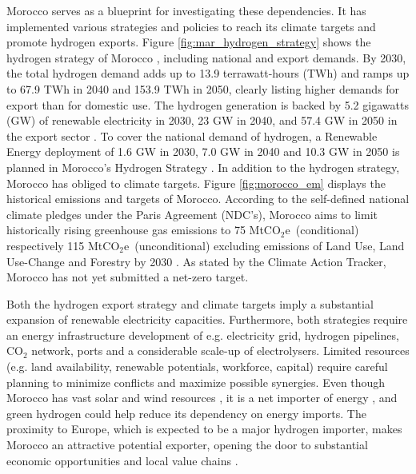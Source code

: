 \documentclass[5p,numafflabel]{elsarticle}
\def\coe{CO${}_2$e}
\begin{document}
Morocco serves as a blueprint for investigating these dependencies. It has implemented various strategies and policies to reach its climate targets and promote hydrogen exports. Figure \ref{fig:mar_hydrogen_strategy} shows the hydrogen strategy of Morocco \cite{MarHyStrat2021}, including national and export demands. By 2030, the total hydrogen demand adds up to 13.9 terrawatt-hours (TWh) and ramps up to 67.9 TWh in 2040 and 153.9 TWh in 2050, clearly listing higher demands for export than for domestic use. The hydrogen generation is backed by 5.2 gigawatts (GW) of renewable electricity in 2030, 23 GW in 2040, and 57.4 GW in 2050 in the export sector \cite{MarHyStrat2021}. To cover the national demand of hydrogen, a Renewable Energy deployment of 1.6 GW in 2030, 7.0 GW in 2040 and 10.3 GW in 2050 is planned in Morocco's Hydrogen Strategy \cite{MarHyStrat2021}. In addition to the hydrogen strategy, Morocco has obliged to climate targets. Figure \ref{fig:morocco_em} displays the historical emissions and targets of Morocco.
According to the self-defined national climate pledges under the Paris Agreement (NDC's), Morocco aims to limit historically rising greenhouse gas emissions to 75 Mt\coe\ (conditional) respectively 115 Mt\coe\ (unconditional) excluding emissions of Land Use, Land Use-Change and Forestry by 2030 \cite{CAT2021}. 
As stated by the Climate Action Tracker\cite{CAT2021}, Morocco has not yet submitted a net-zero target. 

Both the hydrogen export strategy and climate targets imply a substantial expansion of renewable electricity capacities. Furthermore, both strategies require an energy infrastructure development of e.g. electricity grid, hydrogen pipelines, $\mathrm{CO_2}$ network, ports and a considerable scale-up of electrolysers.
Limited resources (e.g. land availability, renewable potentials, workforce, capital) require careful planning to minimize conflicts and maximize possible synergies. Even though Morocco has vast solar and wind resources \cite{Peters2023, Touili2018, Sterl2022}, it is a net importer of energy \cite{IEA2022}, and green hydrogen could help reduce its dependency on energy imports. The proximity to Europe, which is expected to be a major hydrogen importer, makes Morocco an attractive potential exporter, opening the door to substantial economic opportunities and local value chains \cite{Ersoy2022}.
\end{document}
